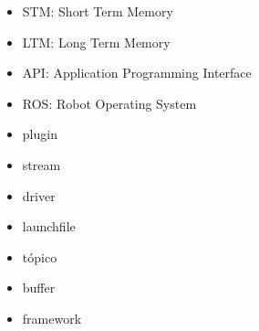 \begin{glosario}\label{chapter:glosario}




\begin{itemize}
\item STM: Short Term Memory
\item LTM: Long Term Memory
\item API: Application Programming Interface
\item ROS: Robot Operating System
\item plugin
\item stream
\item driver
\item launchfile
\item tópico
\item buffer
\item framework
\end{itemize}

\end{glosario}	
